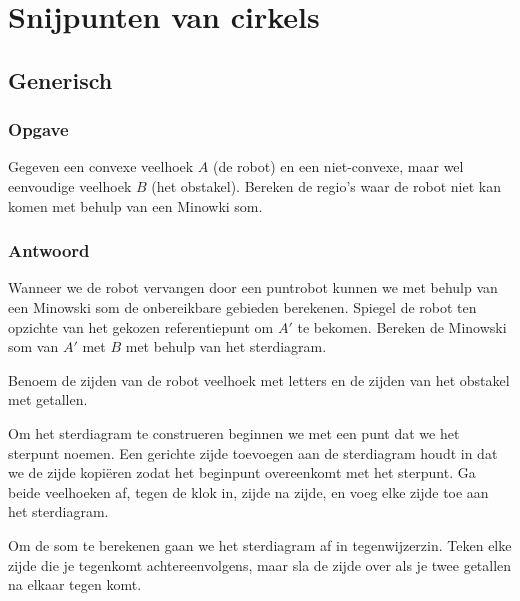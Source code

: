 \documentclass[examenvragen.tex]{subfiles}
\begin{document}
\section{Snijpunten van cirkels}
\subsection{Generisch}
\subsubsection{Opgave}
Gegeven een convexe veelhoek $A$ (de robot) en een niet-convexe, maar wel eenvoudige veelhoek $B$ (het obstakel). Bereken de regio's waar de robot niet kan komen met behulp van een Minowki som.

\subsubsection{Antwoord}
Wanneer we de robot vervangen door een puntrobot kunnen we met behulp van een Minowski som de onbereikbare gebieden berekenen. Spiegel de robot ten opzichte van het gekozen referentiepunt om $A'$ te bekomen. Bereken de Minowski som van $A'$ met $B$ met behulp van het sterdiagram.

Benoem de zijden van de robot veelhoek met letters en de zijden van het obstakel met getallen.

Om het sterdiagram te construeren beginnen we met een punt dat we het sterpunt noemen. Een gerichte zijde toevoegen aan de sterdiagram houdt in dat we de zijde kopi\"eren zodat het beginpunt overeenkomt met het sterpunt. Ga beide veelhoeken af, tegen de klok in, zijde na zijde, en voeg elke zijde toe aan het sterdiagram.

Om de som te berekenen gaan we het sterdiagram af in tegenwijzerzin. Teken elke zijde die je tegenkomt achtereenvolgens, maar sla de zijde over als je twee getallen na elkaar tegen komt.
\end{document}
